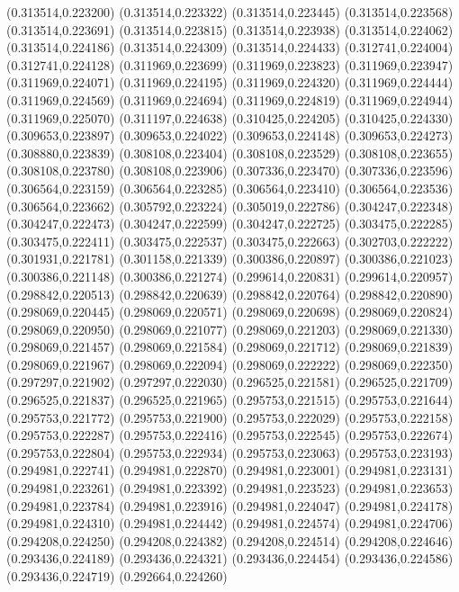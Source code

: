 (0.313514,0.223200)
(0.313514,0.223322)
(0.313514,0.223445)
(0.313514,0.223568)
(0.313514,0.223691)
(0.313514,0.223815)
(0.313514,0.223938)
(0.313514,0.224062)
(0.313514,0.224186)
(0.313514,0.224309)
(0.313514,0.224433)
(0.312741,0.224004)
(0.312741,0.224128)
(0.311969,0.223699)
(0.311969,0.223823)
(0.311969,0.223947)
(0.311969,0.224071)
(0.311969,0.224195)
(0.311969,0.224320)
(0.311969,0.224444)
(0.311969,0.224569)
(0.311969,0.224694)
(0.311969,0.224819)
(0.311969,0.224944)
(0.311969,0.225070)
(0.311197,0.224638)
(0.310425,0.224205)
(0.310425,0.224330)
(0.309653,0.223897)
(0.309653,0.224022)
(0.309653,0.224148)
(0.309653,0.224273)
(0.308880,0.223839)
(0.308108,0.223404)
(0.308108,0.223529)
(0.308108,0.223655)
(0.308108,0.223780)
(0.308108,0.223906)
(0.307336,0.223470)
(0.307336,0.223596)
(0.306564,0.223159)
(0.306564,0.223285)
(0.306564,0.223410)
(0.306564,0.223536)
(0.306564,0.223662)
(0.305792,0.223224)
(0.305019,0.222786)
(0.304247,0.222348)
(0.304247,0.222473)
(0.304247,0.222599)
(0.304247,0.222725)
(0.303475,0.222285)
(0.303475,0.222411)
(0.303475,0.222537)
(0.303475,0.222663)
(0.302703,0.222222)
(0.301931,0.221781)
(0.301158,0.221339)
(0.300386,0.220897)
(0.300386,0.221023)
(0.300386,0.221148)
(0.300386,0.221274)
(0.299614,0.220831)
(0.299614,0.220957)
(0.298842,0.220513)
(0.298842,0.220639)
(0.298842,0.220764)
(0.298842,0.220890)
(0.298069,0.220445)
(0.298069,0.220571)
(0.298069,0.220698)
(0.298069,0.220824)
(0.298069,0.220950)
(0.298069,0.221077)
(0.298069,0.221203)
(0.298069,0.221330)
(0.298069,0.221457)
(0.298069,0.221584)
(0.298069,0.221712)
(0.298069,0.221839)
(0.298069,0.221967)
(0.298069,0.222094)
(0.298069,0.222222)
(0.298069,0.222350)
(0.297297,0.221902)
(0.297297,0.222030)
(0.296525,0.221581)
(0.296525,0.221709)
(0.296525,0.221837)
(0.296525,0.221965)
(0.295753,0.221515)
(0.295753,0.221644)
(0.295753,0.221772)
(0.295753,0.221900)
(0.295753,0.222029)
(0.295753,0.222158)
(0.295753,0.222287)
(0.295753,0.222416)
(0.295753,0.222545)
(0.295753,0.222674)
(0.295753,0.222804)
(0.295753,0.222934)
(0.295753,0.223063)
(0.295753,0.223193)
(0.294981,0.222741)
(0.294981,0.222870)
(0.294981,0.223001)
(0.294981,0.223131)
(0.294981,0.223261)
(0.294981,0.223392)
(0.294981,0.223523)
(0.294981,0.223653)
(0.294981,0.223784)
(0.294981,0.223916)
(0.294981,0.224047)
(0.294981,0.224178)
(0.294981,0.224310)
(0.294981,0.224442)
(0.294981,0.224574)
(0.294981,0.224706)
(0.294208,0.224250)
(0.294208,0.224382)
(0.294208,0.224514)
(0.294208,0.224646)
(0.293436,0.224189)
(0.293436,0.224321)
(0.293436,0.224454)
(0.293436,0.224586)
(0.293436,0.224719)
(0.292664,0.224260)
